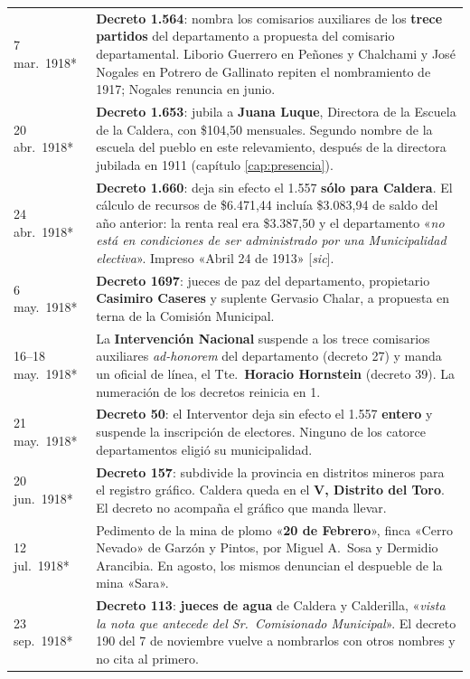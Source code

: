 \begin{longtable}{@{}p{2.7cm}p{10.3cm}@{}}
7 mar.\ 1918* & \textbf{Decreto 1.564}: nombra los comisarios auxiliares de los \textbf{trece partidos} del departamento a propuesta del comisario departamental. Liborio Guerrero\index{Guerrero, Liborio} en Peñones y Chalchami y José Nogales en Potrero de Gallinato repiten el nombramiento de 1917; Nogales renuncia en junio. \\
20 abr.\ 1918* & \textbf{Decreto 1.653}: jubila a \textbf{Juana Luque}, Directora de la Escuela de la Caldera, con \$104,50 mensuales. Segundo nombre de la escuela del pueblo en este relevamiento, después de la directora jubilada en 1911 (capítulo \ref{cap:presencia}). \\
24 abr.\ 1918* & \textbf{Decreto 1.660}: deja sin efecto el 1.557 \textbf{sólo para Caldera}. El cálculo de recursos de \$6.471,44 incluía \$3.083,94 de saldo del año anterior: la renta real era \$3.387,50 y el departamento «\textit{no está en condiciones de ser administrado por una Municipalidad electiva}». Impreso «Abril 24 de 1913» [\textit{sic}]. \\
6 may.\ 1918* & \textbf{Decreto 1697}: jueces de paz del departamento, propietario \textbf{Casimiro Caseres} y suplente Gervasio Chalar, a propuesta en terna de la Comisión Municipal. \\
16--18 may.\ 1918* & La \textbf{Intervención Nacional} suspende a los trece comisarios auxiliares \textit{ad-honorem} del departamento (decreto 27) y manda un oficial de línea, el Tte.\ \textbf{Horacio Hornstein} (decreto 39). La numeración de los decretos reinicia en 1. \\
21 may.\ 1918* & \textbf{Decreto 50}: el Interventor deja sin efecto el 1.557 \textbf{entero} y suspende la inscripción de electores. Ninguno de los catorce departamentos eligió su municipalidad. \\
20 jun.\ 1918* & \textbf{Decreto 157}: subdivide la provincia en distritos mineros para el registro gráfico. Caldera queda en el \textbf{V, Distrito del Toro}. El decreto no acompaña el gráfico que manda llevar. \\
12 jul.\ 1918* & Pedimento de la mina de plomo «\textbf{20 de Febrero}», finca «Cerro Nevado» de Garzón y Pintos, por Miguel A.\ Sosa y Dermidio Arancibia. En agosto, los mismos denuncian el despueble de la mina «Sara». \\
23 sep.\ 1918* & \textbf{Decreto 113}: \textbf{jueces de agua} de Caldera y Calderilla, «\textit{vista la nota que antecede del Sr.\ Comisionado Municipal}». El decreto 190 del 7 de noviembre vuelve a nombrarlos con otros nombres y no cita al primero. \\

\end{longtable}
